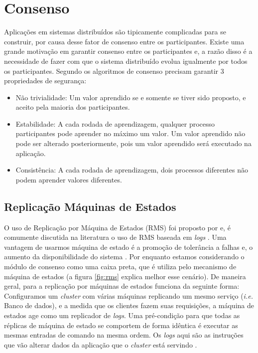 \chapter{Consenso}

Aplicações em sistemas distribuídos são tipicamente complicadas para se construir, por causa desse fator de consenso entre os participantes. Existe uma grande motivação em garantir consenso entre os participantes e, a razão disso é a necessidade de fazer com que o sistema distribuído evolua igualmente por todos os participantes. Segundo \cite{lamport2001paxos} os algoritmos de consenso precisam garantir 3 propriedades de segurança:

\begin{itemize}
\item Não trivialidade: Um valor aprendido se e somente se tiver sido proposto, e aceito pela maioria dos participantes.

\item Estabilidade: A cada rodada de aprendizagem, qualquer processo participantes pode aprender no máximo um valor. Um valor aprendido não pode ser alterado posteriormente, pois um valor aprendido será executado na aplicação.

\item Consistência: A cada rodada de aprendizagem, dois processos diferentes não podem aprender valores diferentes. 
\end{itemize}

\section{Replicação Máquinas de Estados}

O uso de Replicação por Máquina de Estados (RMS) foi proposto por \textcite{schneider1990} e, é comumente discutida na literatura o uso de RMS baseada em \textit{logs} \cite{lamport2001paxos}. Uma vantagem de usarmos máquina de estado é a promoção de tolerância a falhas e, o aumento da disponibilidade do sistema \cite{lamport1978implementation, schneider1990}. Por enquanto estamos considerando o módulo de consenso como uma caixa preta, que é utiliza pelo mecanismo de máquina de estados (a figura \ref{fig:rms} explica melhor esse cenário). De maneira geral, para a replicação por máquinas de estados funciona da seguinte forma: Configuramos um \textit{cluster} com várias máquinas replicando um mesmo serviço (\textit{i.e.} Banco de dados), e a medida que os clientes fazem suas requisições, a máquina de estados age como um replicador de \textit{logs}. Uma pré-condição para que todas as réplicas de máquina de estado se comportem de forma idêntica é executar as mesmas entradas de comando na mesma ordem. Os \textit{logs} aqui são as instruções que vão alterar dados da aplicação que o \textit{cluster} está servindo \cite[p.~216]{PauloVerissimoLuisRodrigues}.

